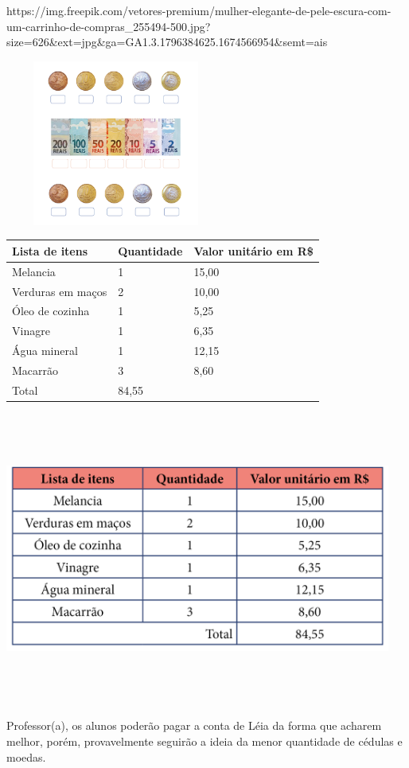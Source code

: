 https://img.freepik.com/vetores-premium/mulher-elegante-de-pele-escura-com-um-carrinho-de-compras\_255494-500.jpg?size=626\&ext=jpg\&ga=GA1.3.1796384625.1674566954\&semt=ais

\includegraphics[width=2.86111in,height=2.14583in]{media/image74.png}

\begin{longtable}[]{@{}lll@{}}
\toprule
Lista de itens & Quantidade & Valor unitário em R\$\tabularnewline
\midrule
\endhead
Melancia & 1 & 15,00\tabularnewline
Verduras em maços & 2 & 10,00\tabularnewline
Óleo de cozinha & 1 & 5,25\tabularnewline
Vinagre & 1 & 6,35\tabularnewline
Água mineral & 1 & 12,15\tabularnewline
Macarrão & 3 & 8,60\tabularnewline
Total & 84,55\tabularnewline
\bottomrule
\end{longtable}

\includegraphics[width=5.00000in,height=3.80208in]{media/image75.png}

Professor(a), os alunos poderão pagar a conta de Léia da forma que
acharem melhor, porém, provavelmente seguirão a ideia da menor
quantidade de cédulas e moedas.

